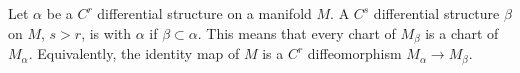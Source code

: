 Let $\alpha$ be a $C^r$ differential structure on a manifold $M$. A $C^s$ differential structure $\beta$ on $M$, $s > r$, is  with $\alpha$ if $\beta \subset \alpha$. This means that every chart of $M_\beta$ is a chart of $M_\alpha$. Equivalently, the identity map of $M$ is a $C^r$ diffeomorphism $M_\alpha \to M_\beta$.
